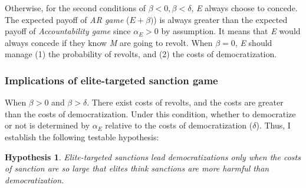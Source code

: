 \documentclass[11pt, letterpage, titlepage]{article}
\newtheorem{hyp}{Hypothesis}
\begin{document}
Otherwise, for the second conditions of $\beta <0, \beta < \delta$, \textit{E} always choose to concede. The expected payoff of \textit{AR game} ($E+\beta)$) is always greater than the expected payoff of \textit{Accountability game} since $\alpha_{E} > 0$ by assumption. It means that \textit{E} would always concede if they know \textit{M} are going to revolt. When $\beta = 0$, \textit{E} should manage (1) the probability of revolts, and (2) the costs of democratization.
	
\subsubsection*{Implications of elite-targeted sanction game}
	
When $\beta > 0$ and $\beta > \delta$. There exist costs of revolts, and the costs are greater than the costs of democratization. Under this condition, whether to democratize or not is determined by $\alpha_{E}$ relative to the costs of democratization ($\delta$). Thus, I establish the following testable hypothesis:
	
\begin{hyp}
	\label{hyp1}
	Elite-targeted sanctions lead democratizations only when the costs of sanction are so large that elites think sanctions are more harmful than democratization.
\end{hyp}


	
\end{document}
